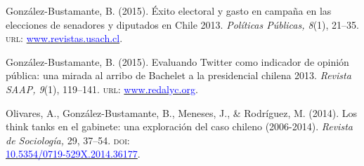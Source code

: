 \begin{publications}
\begin{benumerate}{14}
\item{González-Bustamante, B. (2015). Éxito electoral y gasto en campaña en las elecciones de senadores y diputados en Chile 2013. {\itshape Políticas Públicas, 8}(1), 21--35. {\scshape url:} \href{http://www.revistas.usach.cl/ojs/index.php/politicas/article/view/2182}{\textcolor{blue}{www.revistas.usach.cl}}.} \vspace{1mm}


\item{González-Bustamante, B. (2015). Evaluando Twitter como indicador de opinión pública: una mirada al arribo de Bachelet a la presidencial chilena 2013. {\itshape Revista SAAP, 9}(1), 119--141. {\scshape url:} \href{https://www.redalyc.org/articulo.oa?id=387142733006}{\textcolor{blue}{www.redalyc.org}}.} \vspace{1mm}


\item{Olivares, A., González-Bustamante, B., Meneses, J., \& Rodríguez, M. (2014). Los think tanks en el gabinete: una exploración del caso chileno (2006-2014). {\itshape Revista de Sociología,} 29, 37--54. {\scshape doi}: \\ \href{https://doi.org/10.5354/0719-529X.2014.36177}{\textcolor{blue}{10.5354/0719-529X.2014.36177}}.} \vspace{1mm} %


\end{benumerate}
\end{publications}
